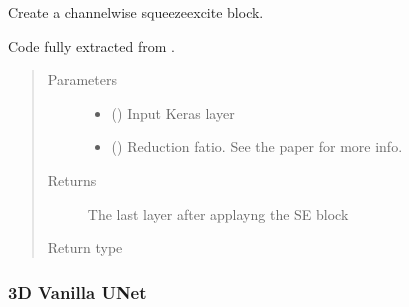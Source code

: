 \documentclass[letterpaper,10pt,english]{sphinxmanual}
\begin{document}
\begin{fulllineitems}
\label{\detokenize{models/se_unet_3d:models.se_unet_3d.squeeze_excite_block}}
Create a channel\sphinxhyphen{}wise squeeze\sphinxhyphen{}excite block.

Code fully extracted from .
\begin{quote}\begin{description}
\item[{Parameters}] \leavevmode\begin{itemize}
\item {} 
 () \textendash{} Input Keras layer

\item {} 
 () \textendash{} Reduction fatio. See the paper for more info.

\end{itemize}

\item[{Returns}] \leavevmode
{} \textendash{} The last layer after applayng the SE block

\item[{Return type}] \leavevmode
{}

\end{description}\end{quote}

\end{fulllineitems}



\subsubsection{3D Vanilla U\sphinxhyphen{}Net}
\label{\detokenize{models/vanilla_unet_3d:module-models.vanilla_unet_3d}}\label{\detokenize{models/vanilla_unet_3d:d-vanilla-u-net}}\label{\detokenize{models/vanilla_unet_3d::doc}}
\end{document}
